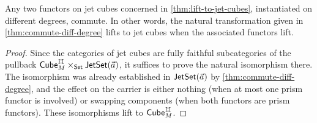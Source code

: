 \documentclass[a4paper]{memoir}
\begin{document}
%	
\begin{proposition} \label{thm:cube-commute-diff-degree}
	Any two functors on jet cubes concerned in \cref{thm:lift-to-jet-cubes}, instantiated on different degrees, commute.
	In other words, the natural transformation given in \cref{thm:commute-diff-degree} lifts to jet cubes when the associated functors lift.
\end{proposition}
\begin{proof}
	Since the categories of jet cubes are fully faithful subcategories of the pullback $\cubecat_M^\mycubex \times_\Set \jetset{\vec a}$, it suffices to prove the natural isomorphism there.
	The isomorphism was already established in $\mathsf{JetSet}(\vec a)$ by \cref{thm:commute-diff-degree}, and the effect on the carrier is either nothing (when at most one prism functor is involved) or swapping components (when both functors are prism functors).
	These isomorphisms lift to $\cubecat_M^\mycubex$.
\end{proof}
\end{document}
